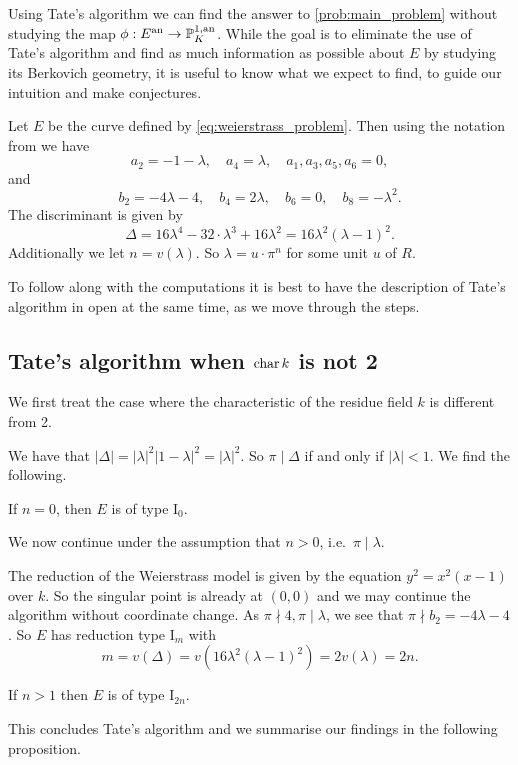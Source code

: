 Using Tate's algorithm we can find the answer to \cref{prob:main_problem} without studying the map $\phi: E\an \to \pro^{1, \text{an}}_K$. 
While the goal is to eliminate the use of Tate's algorithm and find as much information as possible about $E$ by studying its Berkovich geometry, 
it is useful to know what we expect to find, to guide our intuition and make conjectures. 

Let $E$ be the curve defined by \eqref{eq:weierstrass_problem}. 
Then using the notation from \cite[p.364]{silvermanAdvancedTopicsArithmetic1994} we have \[
a_2 = -1 - \lambda,\quad a_4 = \lambda, \quad a_1, a_3, a_5, a_6 = 0
,\] 
and \[
b_2 = -4 \lambda - 4, \quad b_4 = 2\lambda, \quad b_6 = 0, \quad b_8 = -\lambda ^2
.\] 
The discriminant is given by \[
	\Delta = 16\lambda^4 - 32\cdot \lambda^3 + 16\lambda^2 = 16 \lambda^2(\lambda - 1)^2
.\] 
Additionally we let $n = v(\lambda)$.
So $\lambda = u \cdot \pi^{n}$ for some unit $u$ of $R$.

To follow along with the computations it is best to have the description of Tate's algorithm in \cite[sec. IV.9]{silvermanAdvancedTopicsArithmetic1994} open at the same time, as we move through the steps. 

\subsection{Tate's algorithm when $\operatorname{char} k$ is not 2} \label{sec:char_k_is_not_2}
We first treat the case where the characteristic of the residue field $k$ is different from 2. 

We have that $|\Delta| = |\lambda|^2 |1-\lambda|^2 = |\lambda|^2 $. 
So $\pi \mid \Delta$ if and only if  $|\lambda| < 1$. 
We find the following. 
\begin{tateconclusion}
	If  $n = 0$, then $E$ is of type $\mathrm I_0$. 
\end{tateconclusion}
We now continue under the assumption that $n > 0$, i.e.\ $\pi \mid \lambda$. 

The reduction of the Weierstrass model is given by the equation $y^2 = x^2 (x - 1)$ over $k$. 
So the singular point is already at $(0, 0)$ and we may continue the algorithm without coordinate change. 
As $\pi \nmid 4, \pi \mid \lambda$, we see that $\pi \nmid b_2 = -4\lambda - 4$. 
So $E$ has reduction type $\mathrm I_m$ with \[
	m = v(\Delta) = v(16 \lambda^2 (\lambda - 1)^2)  = 2v(\lambda) = 2n
.\]
\begin{tateconclusion}
	If $n > 1$ then $E$ is of type $\mathrm I_{2n}$.
\end{tateconclusion}
This concludes Tate's algorithm and we summarise our findings in the following proposition. 

